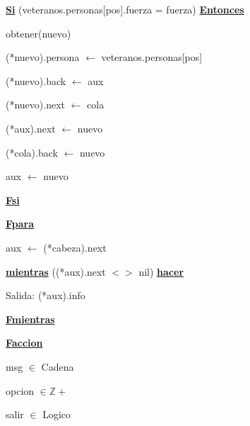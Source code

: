 \documentclass{article}
\begin{document}
                \hspace{16mm}\underline{\textbf{Si}} (veteranos.personas[pos].fuerza = fuerza) \underline{\textbf{Entonces}}

                    \hspace{20mm}obtener(nuevo)

                    \hspace{20mm}(*nuevo).persona $\leftarrow$ veteranos.personas[pos]

                    \hspace{20mm}(*nuevo).back $\leftarrow$ aux

                    \hspace{20mm}(*nuevo).next $\leftarrow$ cola

                    \hspace{20mm}(*aux).next $\leftarrow$ nuevo

                    \hspace{20mm}(*cola).back $\leftarrow$ nuevo

                    \hspace{20mm}aux $\leftarrow$ nuevo

                \hspace{16mm}\underline{\textbf{Fsi}}

            \hspace{12mm}\underline{\textbf{Fpara}}

            \hspace{12mm}aux $\leftarrow$ (*cabeza).next

            \hspace{12mm}\underline{\textbf{mientras}} ((*aux).next $<>$ nil) \underline{\textbf{hacer}}

                \hspace{16mm}Salida: (*aux).info

            \hspace{12mm}\underline{\textbf{Fmientras}}

    \hspace{4mm}\underline{\textbf{Faccion}}

    \vspace{4mm}

    \hspace{4mm}msg $\in$ Cadena

    \hspace{4mm}opcion $\in \mathbb{Z+}$

    \hspace{4mm}salir $\in$ Logico
\end{document}
